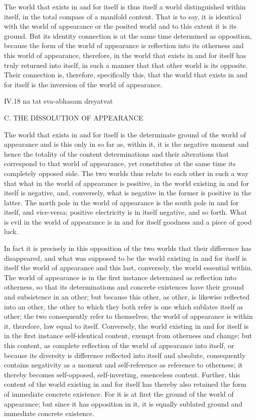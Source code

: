 The world that exists in and for itself is
thus itself a world distinguished within itself,
in the total compass of a manifold content.
That is to say, it is identical with the world of appearance
or the posited world and to this extent it is its ground.
But its identity connection is at the same time
determined as opposition,
because the form of the world of appearance is
reflection into its otherness
and this world of appearance, therefore, in the
world that exists in and for itself
has truly returned into itself,
in such a manner that
that other world is its opposite.
Their connection is, therefore, specifically this,
that the world that exists in and for itself is
the inversion of the world of appearance.

IV.18
na tat sva-abhasam drsyatvat

C. THE DISSOLUTION OF APPEARANCE

The world that exists in and for itself is
the determinate ground of the world of appearance
and is this only in so far as, within it,
it is the negative moment
and hence the totality of the content determinations
and their alterations that correspond to that world of appearance,
yet constitutes at the same time its completely opposed side.
The two worlds thus relate to each other in such a way
that what in the world of appearance is positive,
in the world existing in and for itself is negative,
and, conversely, what is negative in the former
is positive in the latter.
The north pole in the world of appearance
is the south pole in and for itself, and vice-versa;
positive electricity is in itself negative, and so forth.
What is evil in the world of appearance is
in and for itself goodness and a piece of good luck.

In fact it is precisely in this opposition
of the two worlds that their difference has disappeared,
and what was supposed to be
the world existing in and for itself is
itself the world of appearance
and this last, conversely,
the world essential within.
The world of appearance is in the first instance
determined as reflection into otherness,
so that its determinations and concrete existences have
their ground and subsistence in an other;
but because this other, as other,
is likewise reflected into an other,
the other to which they both refer is
one which sublates itself as other;
the two consequently refer to themselves;
the world of appearance is within it,
therefore, law equal to itself.
Conversely, the world existing in and for itself is
in the first instance self-identical content,
exempt from otherness and change;
but this content, as complete reflection of
the world of appearance into itself,
or because its diversity is difference
reflected into itself and absolute,
consequently contains negativity as a moment
and self-reference as reference to otherness;
it thereby becomes self-opposed, self-inverting, essenceless content.
Further, this content of the world existing in and for itself has
thereby also retained the form of immediate concrete existence.
For it is at first the ground of the world of appearance;
but since it has opposition in it, it is equally
sublated ground and immediate concrete existence.

